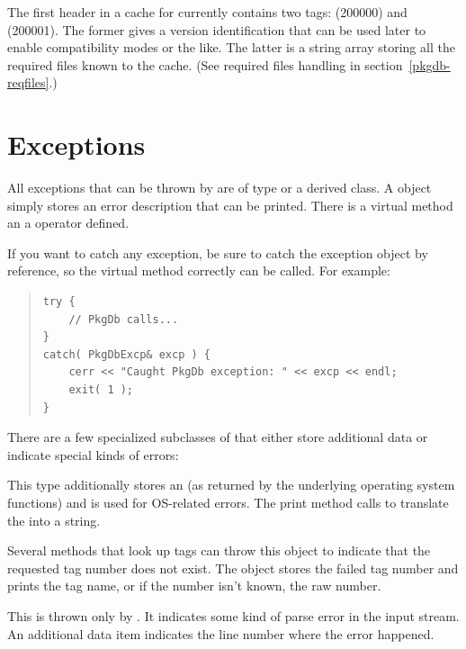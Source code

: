 \documentclass[10pt]{article}
\begin{document}
The first header in a cache for  currently contains two
tags:  (200000) and
 (200001). The former gives a version
identification that can be used later to enable compatibility modes or
the like. The latter is a string array storing all the required files
known to the cache. (See required files handling in
section~\ref{pkgdb-reqfiles}.)



\section{Exceptions}

All exceptions that can be thrown by  are of type
\excp{} or a derived class. A \excp{} object
simply stores an error description that can be printed. There is a
virtual  method an a \val{<<} operator defined.

If you want to catch any exception, be sure to catch the exception
object by reference, so the virtual method correctly can be called.
For example:
\begin{quote}
\begin{verbatim}
try {
    // PkgDb calls...
}
catch( PkgDbExcp& excp ) {
    cerr << "Caught PkgDb exception: " << excp << endl;
    exit( 1 );
}
\end{verbatim}
\end{quote}

There are a few specialized subclasses of \excp{} that either store
additional data or indicate special kinds of errors:


This type additionally stores an  (as returned by the
underlying operating system functions) and is used for OS-related
errors. The print method calls  to translate the
 into a string.


Several methods that look up tags can throw this object to indicate
that the requested tag number does not exist. The object stores the
failed tag number and  prints the tag name, or if the
number isn't known, the raw number.


This is thrown only by . It indicates some kind
of parse error in the input stream. An additional data item indicates
the line number where the error happened.
\end{document}
